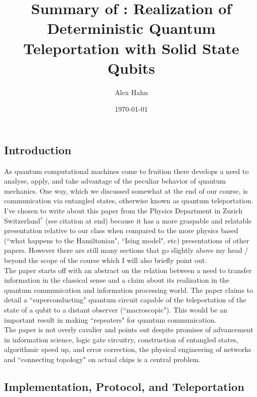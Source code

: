 

\title{Summary of : Realization of Deterministic Quantum Teleportation with
Solid State Qubits}
\author{Alex Hahn}
\date{\today}
\maketitle

\subsection*{Introduction}
As quantum computational machines come to fruition there develops a need to
analyse, apply, and take advantage of the peculiar behavior of quantum
mechanics. One way, which we discussed somewhat at the end of our course, is
communication via entangled states, otherwise known as quantum
teleportation. I've chosen to write about this paper from the Physics
Department in Zurich Switzerland$^*$ (see citation at end) because it has a more
graspable and relatable presentation relative to our class when compared to the
more physics based (``what happens to the Hamiltonian", ``Ising model", etc) presentations of other papers. However there are still many sections that go slightly above my
head / beyond the scope of the course which I will also briefly point out.\\

The paper starts off with an abstract on the relation between a need to transfer
information in the classical sense and a claim about its realization in the
quantum communication and information processing world. The paper claims to
detail
a ``superconducting" quantum circuit capable of the teleportation of the
state of a qubit to a distant observer (``macroscopic"). This would be an
important result in making ``repeaters" for quantum communication.\\

The paper is not overly cavalier and points out despite promises of
advancement in information science, logic gate circuitry, construction of
entangled states, algorithmic speed up, and error correction, the physical
engineering of networks and ``connecting topology" on actual chips is a
central problem.

\subsection*{Implementation, Protocol, and Teleportation}

